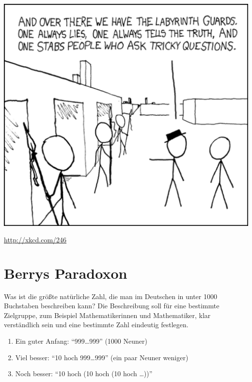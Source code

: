 \documentclass[twoside]{../zirkelblatt1415}
\theoremstyle{definition}
\theoremstyle{plain}
\theoremstyle{remark}
\newenvironment{listing}{
  \renewcommand*\theenumi{\arabic{enumi}}
  \renewcommand{\labelenumi}{\theenumi.}
  \begin{enumerate}\itemsep0em}{\end{enumerate}}
\begin{document}

\begin{center}
  \includegraphics[scale=1.1]{labyrinth_puzzle}

  {\small \url{http://xkcd.com/246}\par}
\end{center}

{\renewcommand\contentsname{}\renewcommand{\addvspace}[1]{\vskip0.6em}\vspace{-1.5em}
\tableofcontents%
}


\section{Berrys Paradoxon}
\label{sect:berry}

Was ist die größte natürliche Zahl, die man im Deutschen in unter 1000
Buchstaben beschreiben kann? Die Beschreibung soll für eine bestimmte
Zielgruppe, zum Beispiel Mathematikerinnen und Mathematiker, klar verständlich
sein und eine bestimmte Zahl eindeutig festlegen.
\begin{listing}
\item Ein guter Anfang: "`999\ldots999"' (1000 Neuner)
\item Viel besser: "`10 hoch 999\ldots999"' (ein paar Neuner weniger)
\item Noch besser: "`10 hoch (10 hoch (10 hoch \ldots))"'
\end{listing}
\end{document}
